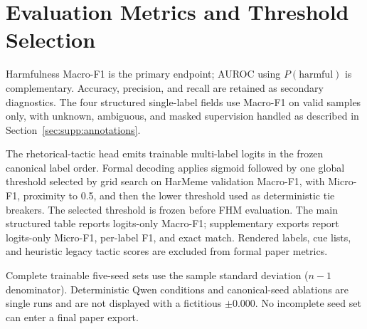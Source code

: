 \section{Evaluation Metrics and Threshold Selection}
\label{sec:supp:evaluation}

Harmfulness Macro-F1 is the primary endpoint; AUROC using
$P(\text{harmful})$ is complementary.  Accuracy, precision, and recall are
retained as secondary diagnostics.  The four structured single-label fields
use Macro-F1 on valid samples only, with unknown, ambiguous, and masked
supervision handled as described in Section~\ref{sec:supp:annotations}.

The rhetorical-tactic head emits trainable multi-label logits in the frozen
canonical label order.  Formal decoding applies sigmoid followed by one global
threshold selected by grid search on HarMeme validation Macro-F1, with
Micro-F1, proximity to 0.5, and then the lower threshold used as deterministic
tie breakers.  The selected threshold is frozen before FHM evaluation.  The
main structured table reports logits-only Macro-F1; supplementary exports
report logits-only Micro-F1, per-label F1, and exact match.  Rendered labels,
cue lists, and heuristic legacy tactic scores are excluded from formal paper
metrics.

Complete trainable five-seed sets use the sample standard deviation
($n-1$ denominator).  Deterministic Qwen conditions and canonical-seed
ablations are single runs and are not displayed with a fictitious
$\pm0.000$.  No incomplete seed set can enter a final paper export.
